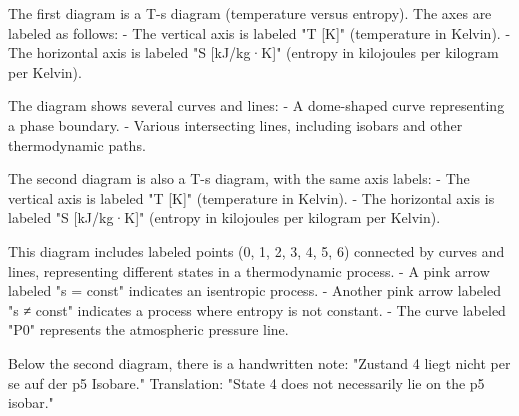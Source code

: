 The first diagram is a T-s diagram (temperature versus entropy). The axes are labeled as follows:  
- The vertical axis is labeled "T [K]" (temperature in Kelvin).  
- The horizontal axis is labeled "S [kJ/kg·K]" (entropy in kilojoules per kilogram per Kelvin).  

The diagram shows several curves and lines:  
- A dome-shaped curve representing a phase boundary.  
- Various intersecting lines, including isobars and other thermodynamic paths.  

The second diagram is also a T-s diagram, with the same axis labels:  
- The vertical axis is labeled "T [K]" (temperature in Kelvin).  
- The horizontal axis is labeled "S [kJ/kg·K]" (entropy in kilojoules per kilogram per Kelvin).  

This diagram includes labeled points (0, 1, 2, 3, 4, 5, 6) connected by curves and lines, representing different states in a thermodynamic process.  
- A pink arrow labeled "s = const" indicates an isentropic process.  
- Another pink arrow labeled "s ≠ const" indicates a process where entropy is not constant.  
- The curve labeled "P0" represents the atmospheric pressure line.  

Below the second diagram, there is a handwritten note:  
"Zustand 4 liegt nicht per se auf der p5 Isobare."  
Translation: "State 4 does not necessarily lie on the p5 isobar."